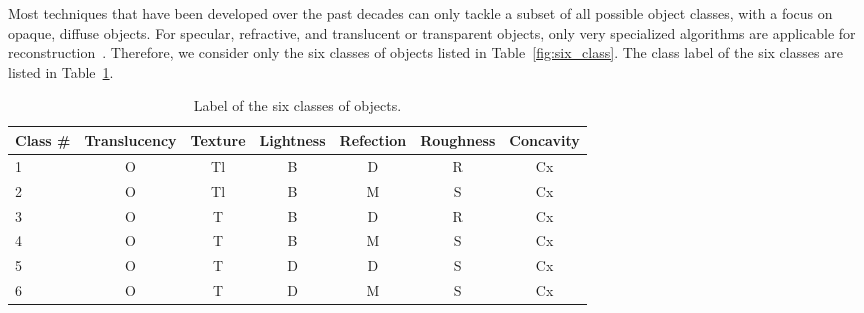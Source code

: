 Most techniques that have been developed over the past decades can only tackle a subset of all possible object classes, with a focus on opaque, diffuse objects. For specular, refractive, and translucent or transparent objects, only very specialized algorithms are applicable for reconstruction~\cite{ihrke2010transparent}. Therefore, we consider only the six classes of objects listed in Table~\ref{fig:six_class}.  The class label of the six classes are listed in Table~\ref{tab:six_obj_class}.
\begin{table}[!htbp]
\centering
\begin{tabular}{l|*{6}{c}}
\toprule
Class \# & Translucency & Texture & Lightness & Refection & Roughness & Concavity\\
\midrule
1 & O & Tl & B & D & R & Cx\\
2 & O & Tl & B & M & S & Cx\\
3 & O & T & B & D & R & Cx\\
4 & O & T & B & M & S & Cx\\
5 & O & T & D & D & S & Cx\\
6 & O & T & D & M & S & Cx\\
\bottomrule
\end{tabular}
\caption{Label of the six classes of objects.}
\label{tab:six_obj_class}
\end{table}

